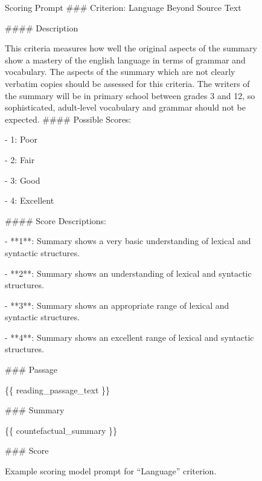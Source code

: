 \begin{figure}
\begin{promptbox}{Scoring Prompt}
\#\#\# Criterion: Language Beyond Source Text

\#\#\#\# Description

This criteria measures how well the original aspects of the summary show a mastery of the english language in terms of grammar and vocabulary. The aspects of the summary which are not clearly verbatim copies should be assessed for this criteria. The writers of the summary will be in primary school between grades 3 and 12, so sophisticated, adult-level vocabulary and grammar should not be expected.
\#\#\#\# Possible Scores:

- 1: Poor

- 2: Fair

- 3: Good

- 4: Excellent

\#\#\#\# Score Descriptions:

- **1**: Summary shows a very basic understanding of lexical and syntactic structures.

- **2**: Summary shows an understanding of lexical and syntactic structures.

- **3**: Summary shows an appropriate range of lexical and syntactic structures.

- **4**: Summary shows an excellent range of lexical and syntactic structures.

\#\#\# Passage

\{\{ reading\_passage\_text \}\}

\#\#\# Summary

\{\{ countefactual\_summary \}\}

\#\#\# Score
\end{promptbox}
\caption{Example scoring model prompt for ``Language'' criterion.}
\label{fig:score_prompt}
\end{figure}
